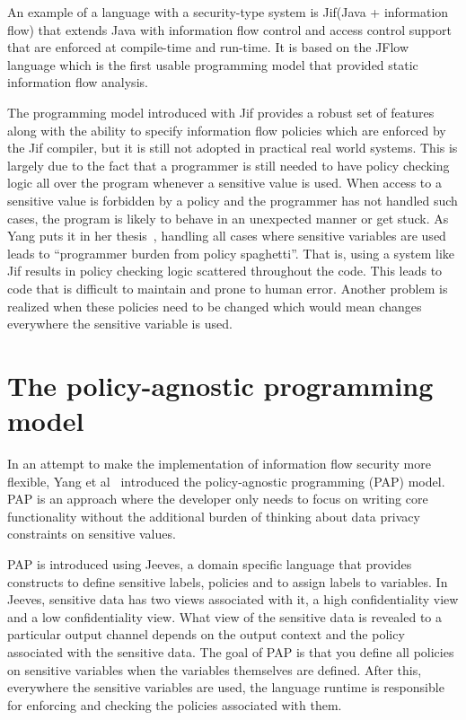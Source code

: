 An example of a language with a security-type system is Jif(Java + information flow)
\cite{jifurl} that extends Java with information flow control and access control support
that are enforced at compile-time and run-time. It is based on the JFlow language
\cite{Jflow} which is the first usable programming model that provided static
information flow analysis.

The programming model introduced with Jif provides a robust set of features along
with the ability to specify information flow policies which are enforced by the Jif
compiler, but it is still not adopted in practical real world systems. This is largely
due to the fact that a programmer is still needed to have policy checking logic
all over the program whenever a sensitive value is used. When access to a sensitive
value is forbidden by a policy and the programmer has not handled such cases, the
program is likely to behave in an unexpected manner or get stuck. As Yang puts it
in her thesis~\cite{YangPhd}, handling all cases where sensitive variables are used
leads to ``programmer burden from policy spaghetti''. That is, using a system like
Jif results in policy checking logic scattered throughout the code. This leads to
code that is difficult to maintain and prone to human error. Another problem is
realized when these policies need to be changed which would mean changes everywhere
the sensitive variable is used.

\section{The policy-agnostic programming model}
In an attempt to make the implementation of information flow security more flexible,
Yang et al~\cite{Jeeves} introduced the policy-agnostic programming (PAP) model.
PAP is an approach where the developer only needs to focus on writing core functionality
without the additional burden of thinking about data privacy constraints on sensitive
values.

PAP is introduced using Jeeves, a domain specific language that provides constructs
to define sensitive labels, policies and to assign labels to variables. In Jeeves,
sensitive data has two views associated with it, a high confidentiality view and a
low confidentiality view. What view of the sensitive data is revealed to a particular
output channel depends on the output context and the policy associated with the
sensitive data. The goal of PAP is that you define all policies on sensitive variables
when the variables themselves are defined. After this, everywhere the sensitive variables
are used, the language runtime is responsible for enforcing and checking the policies
associated with them.

